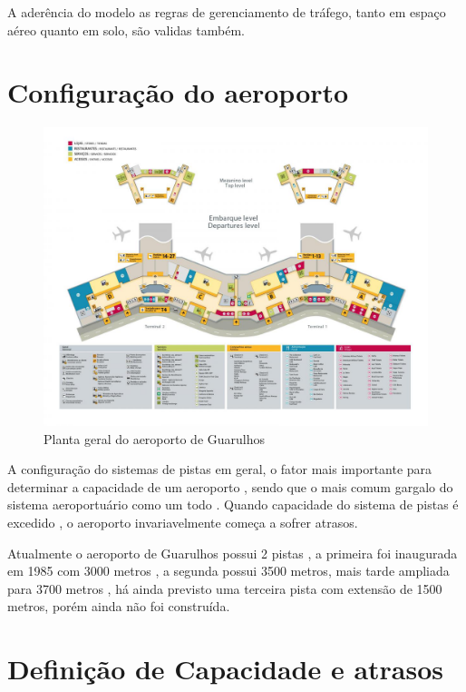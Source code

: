 \documentclass[12pt]{article}
\begin{document}
A aderência do modelo as regras de gerenciamento de tráfego, tanto em espaço
aéreo quanto em solo, são validas também.


\section{Configuração do aeroporto}

\begin{figure}[b!]
  \centering
  \includegraphics[width=.9\textwidth]{aeroporto.png}
  \caption{Planta geral do aeroporto de Guarulhos}
  \label{fig:aeropoto}
\end{figure}

A configuração do sistemas de pistas em geral, o fator mais importante
para determinar a capacidade de um aeroporto , sendo que o mais comum 
gargalo do sistema aeroportuário como um todo . Quando capacidade do 
sistema de pistas é excedido , o aeroporto invariavelmente começa a 
sofrer atrasos.



Atualmente o aeroporto de Guarulhos possui 2 pistas , a primeira foi 
inaugurada em 1985 com  3000 metros , a segunda possui 3500 metros, 
mais tarde ampliada para 3700 metros , há ainda previsto uma terceira
pista com extensão de 1500 metros, porém ainda não foi construída. 


\section{Definição de Capacidade e atrasos}
\end{document}
